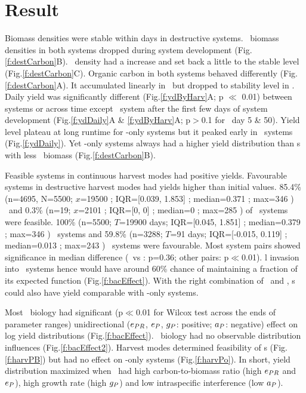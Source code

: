 \documentclass[../thesis.tex]{subfiles} %
\begin{document}
\section{Result}
Biomass densities were stable within days in destructive systems.  \Phy\ biomass densities in both systems dropped during system development (Fig.\ref{f:destCarbon}B).  \Bac\ density had a increase and set back a little to the stable level (Fig.\ref{f:destCarbon}C).  Organic carbon in both systems behaved differently (Fig.\ref{f:destCarbon}A).  It accumulated linearly in \PoN\ but dropped to stability level in \PBN.  Daily yield was significantly different (Fig.\ref{f:ydByHarv}A; p $\ll$ 0.01) between systems or across time except \PoN\ system after the first few days of system development (Fig.\ref{f:ydDaily}A \& \ref{f:ydByHarv}A; p$>$0.1 for \PoN\ day 5 \& 50).  Yield level plateau at long runtime for \phy-only systems but it peaked early in \PBN\ systems (Fig.\ref{f:ydDaily}).  Yet \phy-only systems always had a higher yield distribution than \pbs s with less \phy\ biomass (Fig.\ref{f:destCarbon}B).

Feasible systems in continuous harvest modes had positive yields.  Favourable systems in destructive harvest modes had yields higher than initial values.  85.4\% (n=4695, N=5500; $x$=19500 \dayU; IQR=[0.039, 1.853] \dxdt; median=0.371 \dxdt; max=346 \dxdt) \PoH\ and 0.3\% (n=19; $x$=2101 \dayU; IQR=[0, 0] \dxdt; median=0 \dxdt; max=285 \dxdt) of \PBH\ systems were feasible.  100\% (n=5500; $T$=19900 days; IQR=[0.045, 1.851] \dxdt; median=0.379 \dxdt; max=346 \dxdt) \PoN\ systems and 59.8\% (n=3288; $T$=91 days; IQR=[-0.015, 0.119] \dxdt; median=0.013 \dxdt; max=243 \dxdt) \PBN\ systems were favourable.  Most system pairs showed significance in median difference (\PoH\ vs \PoN: p=0.36; other pairs: p$\ll$0.01).  \Bac l invasion into \PoN\ systems hence would have around 60\% chance of maintaining a fraction of its expected function (Fig.\ref{f:bacEffect}).  With the right combination of \phy\ and \bac, \pbs s could also have yield comparable with \phy-only systems.

Most \phy\ biology had significant (p$\ll$0.01 for Wilcox test across the ends of parameter ranges) unidirectional ($e_{PR}$, $e_P$, $g_P$: positive; $a_P$: negative) effect on log yield distributions (Fig.\ref{f:bacEffect}).  \Bac\ biology had no observable distribution influences (Fig.\ref{f:bacEffect2}).  Harvest modes determined feasibility of \pbs s (Fig.\ref{f:harvPB}) but had no effect on \phy-only systems (Fig.\ref{f:harvPo}).  In short, yield distribution maximized when \phy\ had high carbon-to-biomass ratio (high $e_{PR}$ and $e_P$), high growth rate (high $g_P$) and low intraspecific interference (low $a_P$).
\end{document}
